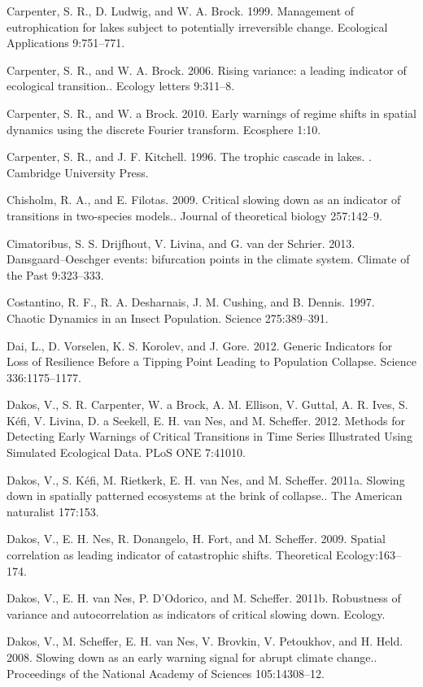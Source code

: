 \documentclass{article}
\begin{document}
Carpenter, S. R., D. Ludwig, and W. A. Brock. 1999. Management of
eutrophication for lakes subject to potentially irreversible change.
Ecological Applications 9:751--771.

Carpenter, S. R., and W. A. Brock. 2006. Rising variance: a leading
indicator of ecological transition.. Ecology letters 9:311--8.

Carpenter, S. R., and W. a Brock. 2010. Early warnings of regime shifts
in spatial dynamics using the discrete Fourier transform. Ecosphere
1:10.

Carpenter, S. R., and J. F. Kitchell. 1996. The trophic cascade in
lakes. . Cambridge University Press.

Chisholm, R. A., and E. Filotas. 2009. Critical slowing down as an
indicator of transitions in two-species models.. Journal of theoretical
biology 257:142--9.

Cimatoribus, S. S. Drijfhout, V. Livina, and G. van der Schrier. 2013.
Dansgaard--Oeschger events: bifurcation points in the climate system.
Climate of the Past 9:323--333.

Costantino, R. F., R. A. Desharnais, J. M. Cushing, and B. Dennis. 1997.
Chaotic Dynamics in an Insect Population. Science 275:389--391.

Dai, L., D. Vorselen, K. S. Korolev, and J. Gore. 2012. Generic
Indicators for Loss of Resilience Before a Tipping Point Leading to
Population Collapse. Science 336:1175--1177.

Dakos, V., S. R. Carpenter, W. a Brock, A. M. Ellison, V. Guttal, A. R.
Ives, S. Kéfi, V. Livina, D. a Seekell, E. H. van Nes, and M. Scheffer.
2012. Methods for Detecting Early Warnings of Critical Transitions in
Time Series Illustrated Using Simulated Ecological Data. PLoS ONE
7:41010.

Dakos, V., S. Kéfi, M. Rietkerk, E. H. van Nes, and M. Scheffer. 2011a.
Slowing down in spatially patterned ecosystems at the brink of
collapse.. The American naturalist 177:153.

Dakos, V., E. H. Nes, R. Donangelo, H. Fort, and M. Scheffer. 2009.
Spatial correlation as leading indicator of catastrophic shifts.
Theoretical Ecology:163--174.

Dakos, V., E. H. van Nes, P. D'Odorico, and M. Scheffer. 2011b.
Robustness of variance and autocorrelation as indicators of critical
slowing down. Ecology.

Dakos, V., M. Scheffer, E. H. van Nes, V. Brovkin, V. Petoukhov, and H.
Held. 2008. Slowing down as an early warning signal for abrupt climate
change.. Proceedings of the National Academy of Sciences 105:14308--12.
\end{document}
